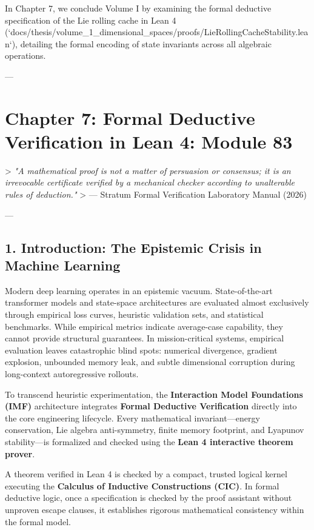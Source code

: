 \documentclass[11pt,twoside,openright]{amsbook}
\begin{document}
{{{{{{In Chapter 7, we conclude Volume I by examining the formal deductive specification of the Lie rolling cache in Lean 4 (`docs/thesis/volume_1_dimensional_spaces/proofs/LieRollingCacheStability.lean`), detailing the formal encoding of state invariants across all algebraic operations.


---

\chapter{Chapter 7: Formal Deductive Verification in Lean 4: Module 83}

> \textit{"A mathematical proof is not a matter of persuasion or consensus; it is an irrevocable certificate verified by a mechanical checker according to unalterable rules of deduction."}  
> — Stratum Formal Verification Laboratory Manual (2026)

---

\section{1. Introduction: The Epistemic Crisis in Machine Learning}

Modern deep learning operates in an epistemic vacuum. State-of-the-art transformer models and state-space architectures are evaluated almost exclusively through empirical loss curves, heuristic validation sets, and statistical benchmarks. While empirical metrics indicate average-case capability, they cannot provide structural guarantees. In mission-critical systems, empirical evaluation leaves catastrophic blind spots: numerical divergence, gradient explosion, unbounded memory leak, and subtle dimensional corruption during long-context autoregressive rollouts.

To transcend heuristic experimentation, the \textbf{Interaction Model Foundations (IMF)} architecture integrates \textbf{Formal Deductive Verification} directly into the core engineering lifecycle. Every mathematical invariant—energy conservation, Lie algebra anti-symmetry, finite memory footprint, and Lyapunov stability—is formalized and checked using the \textbf{Lean 4 interactive theorem prover}.

A theorem verified in Lean 4 is checked by a compact, trusted logical kernel executing the \textbf{Calculus of Inductive Constructions (CIC)}. In formal deductive logic, once a specification is checked by the proof assistant without unproven escape clauses, it establishes rigorous mathematical consistency within the formal model.

}}}}}}
\end{document}
